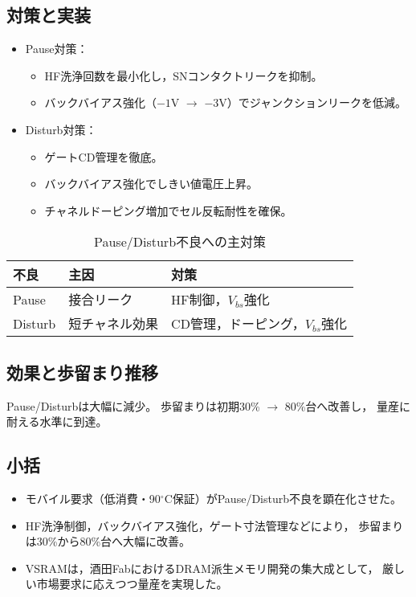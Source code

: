 \documentclass[conference]{IEEEtran}
\begin{document}
\subsection{対策と実装}
\begin{itemize}
  \item Pause対策：
    \begin{itemize}
      \item HF洗浄回数を最小化し，SNコンタクトリークを抑制。
      \item バックバイアス強化（$-1$V $\rightarrow$ $-3$V）でジャンクションリークを低減。
    \end{itemize}
  \item Disturb対策：
    \begin{itemize}
      \item ゲートCD管理を徹底。
      \item バックバイアス強化でしきい値電圧上昇。
      \item チャネルドーピング増加でセル反転耐性を確保。
    \end{itemize}
\end{itemize}

\begin{table}[t]
\centering
\caption{Pause/Disturb不良への主対策}
\begin{tabular}{lll}
\toprule
不良 & 主因 & 対策 \\
\midrule
Pause & 接合リーク & HF制御，$V_{bs}$強化 \\
Disturb & 短チャネル効果 & CD管理，ドーピング，$V_{bs}$強化 \\
\bottomrule
\end{tabular}
\end{table}

\subsection{効果と歩留まり推移}
Pause/Disturbは大幅に減少。
歩留まりは初期30\% $\rightarrow$ 80\%台へ改善し，
量産に耐える水準に到達。

\subsection{小括}
\begin{itemize}
  \item モバイル要求（低消費・90$^\circ$C保証）がPause/Disturb不良を顕在化させた。
  \item HF洗浄制御，バックバイアス強化，ゲート寸法管理などにより，
        歩留まりは30\%から80\%台へ大幅に改善。
  \item VSRAMは，酒田FabにおけるDRAM派生メモリ開発の集大成として，
        厳しい市場要求に応えつつ量産を実現した。
\end{itemize}
\end{document}
